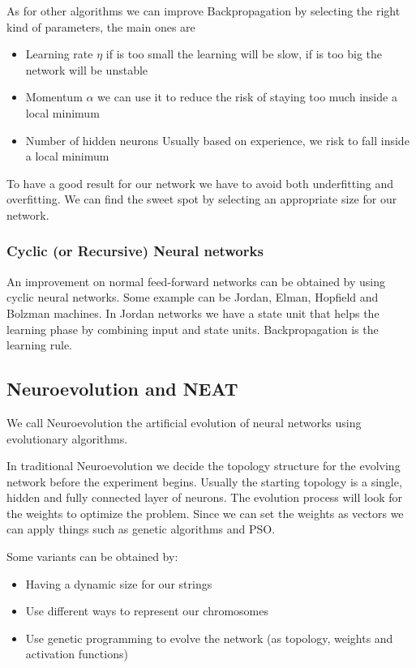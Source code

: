 As for other algorithms we can improve Backpropagation by selecting the right kind of parameters, the main ones are

\begin{itemize}
    \item Learning rate $\eta$ \ra if is too small the learning will be slow, if is too big the network will be unstable
    \item Momentum $\alpha$ \ra we can use it to reduce the risk of staying too much inside a local minimum
    \item Number of hidden neurons \ra Usually based on experience, we risk to fall inside a local minimum
\end{itemize}

To have a good result for our network we have to avoid both underfitting and overfitting. We can find the sweet spot by selecting an appropriate size for our network. 


\subsubsection{Cyclic (or Recursive) Neural networks}

An improvement on normal feed-forward networks can be obtained by using cyclic neural networks. Some example can be Jordan, Elman, Hopfield and Bolzman machines. In Jordan networks we have a state unit that helps the learning phase by combining input and state units. Backpropagation is the learning rule. 

\subsection{Neuroevolution and NEAT}

We call Neuroevolution the artificial evolution of neural networks using evolutionary algorithms. 

In traditional Neuroevolution we decide the topology structure for the evolving network before the experiment begins. Usually the starting topology is a single, hidden and fully connected layer of neurons. The evolution process will look for the weights to optimize the problem. Since we can set the weights as vectors we can apply things such as genetic algorithms and PSO. 

\vspace{10pt}

Some variants can be obtained by:

\begin{itemize}
    \item Having a dynamic size for our strings
    \item Use different ways to represent our chromosomes
    \item Use genetic programming to evolve the network (as topology, weights and activation functions)
\end{itemize}


